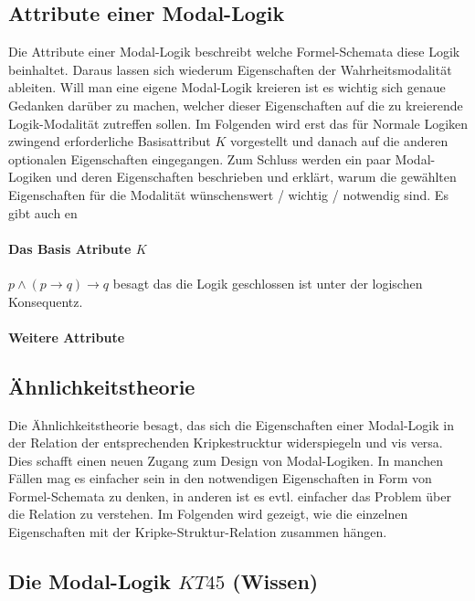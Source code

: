 
\subsection{Attribute einer Modal-Logik} %
\label{sub:attribute_einer_modal_logik}
Die Attribute einer Modal-Logik beschreibt welche Formel-Schemata diese Logik beinhaltet. Daraus lassen sich wiederum Eigenschaften der Wahrheitsmodalität ableiten. 
Will man eine eigene Modal-Logik kreieren ist es wichtig sich genaue Gedanken darüber zu machen, welcher dieser Eigenschaften auf die zu kreierende Logik-Modalität zutreffen sollen.
Im Folgenden wird erst das für Normale Logiken zwingend erforderliche Basisattribut $K$ vorgestellt und danach auf die anderen optionalen Eigenschaften eingegangen. 
Zum Schluss werden ein paar Modal-Logiken und deren Eigenschaften beschrieben und erklärt, warum die gewählten Eigenschaften für die Modalität wünschenswert / wichtig / notwendig sind.
Es gibt auch en

\paragraph{Das Basis Atribute $K$} %
\label{par:das_basis_atribute_k_} $p \wedge (p \rightarrow q) \rightarrow q$ besagt das die Logik geschlossen ist unter der logischen Konsequentz. 

\paragraph{Weitere Attribute} %
\label{par:weitere_attribute} 


\subsection{Ähnlichkeitstheorie} %
\label{sub:Aehnlichkeitstheorie}
Die Ähnlichkeitstheorie besagt, das sich die Eigenschaften einer Modal-Logik in der Relation der entsprechenden Kripkestrucktur widerspiegeln und vis versa. 
Dies schafft einen neuen Zugang zum Design von Modal-Logiken. 
In manchen Fällen mag es einfacher sein in den notwendigen Eigenschaften in Form von Formel-Schemata zu denken, in anderen ist es evtl. einfacher das Problem über die Relation zu verstehen. 
Im Folgenden wird gezeigt, wie die einzelnen Eigenschaften mit der Kripke-Struktur-Relation zusammen hängen.




\subsection{Die Modal-Logik $KT45$ (Wissen)} %
\label{sub:the_normal_modal_logic_s5_}

